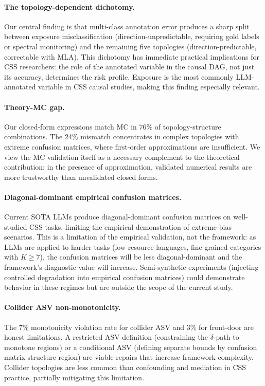\documentclass[11pt]{article}
\begin{document}
\paragraph{The topology-dependent dichotomy.}
Our central finding is that multi-class annotation error produces a sharp split between exposure misclassification (direction-unpredictable, requiring gold labels or spectral monitoring) and the remaining five topologies (direction-predictable, correctable with MLA).
This dichotomy has immediate practical implications for CSS researchers: the role of the annotated variable in the causal DAG, not just its accuracy, determines the risk profile.
Exposure is the most commonly LLM-annotated variable in CSS causal studies, making this finding especially relevant.

\paragraph{Theory-MC gap.}
Our closed-form expressions match MC in 76\% of topology-structure combinations.
The 24\% mismatch concentrates in complex topologies with extreme confusion matrices, where first-order approximations are insufficient.
We view the MC validation itself as a necessary complement to the theoretical contribution: in the presence of approximation, validated numerical results are more trustworthy than unvalidated closed forms.

\paragraph{Diagonal-dominant empirical confusion matrices.}
Current SOTA LLMs produce diagonal-dominant confusion matrices on well-studied CSS tasks, limiting the empirical demonstration of extreme-bias scenarios.
This is a limitation of the empirical validation, not the framework: as LLMs are applied to harder tasks (low-resource languages, fine-grained categories with $K \geq 7$), the confusion matrices will be less diagonal-dominant and the framework's diagnostic value will increase.
Semi-synthetic experiments (injecting controlled degradation into empirical confusion matrices) could demonstrate behavior in these regimes but are outside the scope of the current study.

\paragraph{Collider ASV non-monotonicity.}
The 7\% monotonicity violation rate for collider ASV and 3\% for front-door are honest limitations.
A restricted ASV definition (constraining the $\delta$-path to monotone regions) or a conditional ASV (defining separate bounds by confusion matrix structure region) are viable repairs that increase framework complexity.
Collider topologies are less common than confounding and mediation in CSS practice, partially mitigating this limitation.
\end{document}
